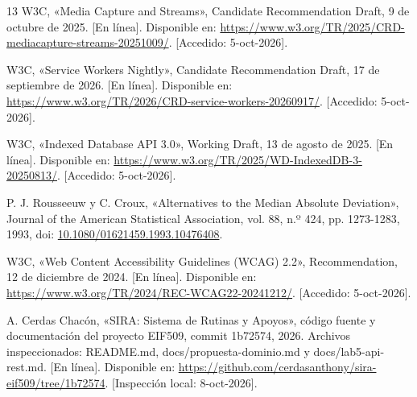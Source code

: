 \documentclass[conference,letterpaper]{IEEEtran}
\begin{document}
\begin{thebibliography}{13}
 W3C, «Media Capture and Streams», Candidate Recommendation Draft, 9 de octubre de 2025. [En línea]. Disponible en: \url{https://www.w3.org/TR/2025/CRD-mediacapture-streams-20251009/}. [Accedido: 5-oct-2026].

 W3C, «Service Workers Nightly», Candidate Recommendation Draft, 17 de septiembre de 2026. [En línea]. Disponible en: \url{https://www.w3.org/TR/2026/CRD-service-workers-20260917/}. [Accedido: 5-oct-2026].

 W3C, «Indexed Database API 3.0», Working Draft, 13 de agosto de 2025. [En línea]. Disponible en: \url{https://www.w3.org/TR/2025/WD-IndexedDB-3-20250813/}. [Accedido: 5-oct-2026].

 P. J. Rousseeuw y C. Croux, «Alternatives to the Median Absolute Deviation», Journal of the American Statistical Association, vol. 88, n.º 424, pp. 1273-1283, 1993, doi: \href{https://doi.org/10.1080/01621459.1993.10476408}{10.1080/01621459.1993.10476408}.

 W3C, «Web Content Accessibility Guidelines (WCAG) 2.2», Recommendation, 12 de diciembre de 2024. [En línea]. Disponible en: \url{https://www.w3.org/TR/2024/REC-WCAG22-20241212/}. [Accedido: 5-oct-2026].

 A. Cerdas Chacón, «SIRA: Sistema de Rutinas y Apoyos», código fuente y documentación del proyecto EIF509, commit 1b72574, 2026. Archivos inspeccionados: README.md, docs/propuesta-dominio.md y docs/lab5-api-rest.md. [En línea]. Disponible en: \url{https://github.com/cerdasanthony/sira-eif509/tree/1b72574}. [Inspección local: 8-oct-2026].

\end{thebibliography}
\end{document}
